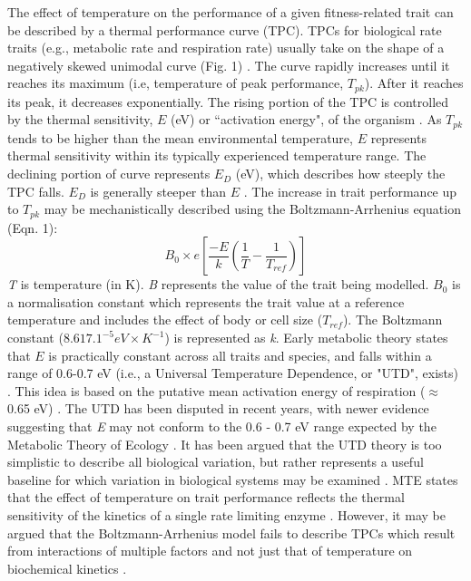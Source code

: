\documentclass[11pt]{article}
\begin{document}
\begin{flushleft}
The effect of temperature on the performance of a given fitness-related trait can be described by a thermal performance curve (TPC). TPCs for biological rate traits (e.g., metabolic rate and respiration rate) usually take on the shape of a negatively skewed unimodal curve (Fig. 1) \citep{angilletta2006estimating,kontopoulos2020adaptive,schulte2015effects}. The curve rapidly increases until it reaches its maximum (i.e, temperature of peak performance, \emph{$T_{pk}$}). After it reaches its peak, it decreases exponentially. The rising portion of the TPC is controlled by the thermal sensitivity, \emph{$E$} (eV) or “activation energy", of the organism \citep{kontopoulos2020adaptive}. As \emph{$T_{pk}$} tends to be higher than the mean environmental temperature, $E$ represents thermal sensitivity within its typically experienced temperature range. The declining portion of curve represents \emph{$E_D$} (eV), which describes how steeply the TPC falls. \emph{$E_D$} is generally steeper than \emph{$E$} \citep{kontopoulos2020adaptive}. The increase in trait performance up to \emph{$T_{pk}$} may be mechanistically described using the Boltzmann-Arrhenius equation (Eqn. 1):
\begin{equation}
B_0 \times e[\frac{-E}{k}(\frac{1}{T} - \frac{1}{T_{ref}})]
\label{eq:1}
\end{equation}
\newline
\emph{T} is temperature (in K). \emph{B} represents the value of the trait being modelled. \emph{$B_0$} is a normalisation constant which represents the trait value at a reference temperature and includes the effect of body or cell size (\emph{$T_{ref}$}). The Boltzmann constant ($8.617.1 ^{-5} eV \times K^{-1}$) is represented as \emph{k}. 
Early metabolic theory states that \emph{$E$} is practically constant across all traits and species, and falls within a range of 0.6-0.7 eV (i.e., a Universal Temperature Dependence, or "UTD", exists) \citep{gillooly2001effects,clarke2004there,pawar2016real,irlich2009insect}. This idea is based on the putative mean activation energy of respiration ($\approx$ 0.65 eV) \citep{kontopoulos2020adaptive,white2012information}. The UTD has been disputed in recent years, with newer evidence suggesting that \emph{E} may not conform to the 0.6 - 0.7 eV range expected by the Metabolic Theory of Ecology \citep{pawar2016real,irlich2009insect,kontopoulos2020adaptive,clarke2004there,white2012information}. It has been argued that the UTD theory is too simplistic to describe all biological variation, but rather represents a useful baseline for which variation in biological systems may be examined \citep{white2012information}. MTE states that the effect of temperature on trait performance reflects the thermal sensitivity of the kinetics of a single rate limiting enzyme \citep{kontopoulos2020adaptive,clarke2004there}. However, it may be argued that the Boltzmann-Arrhenius model fails to describe TPCs which result from interactions of multiple factors and not just that of temperature on biochemical kinetics \citep{kontopoulos2020adaptive,white2012information,pawar2016real}. 

\end{flushleft}
\end{document}
